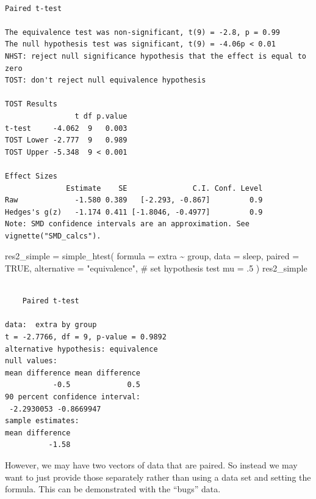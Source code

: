 \documentclass[
]{interact}
\newenvironment{Shaded}{\begin{snugshade}}{\end{snugshade}}
\newcommand{\AttributeTok}[1]{\textcolor[rgb]{0.40,0.45,0.13}{#1}}
\newcommand{\CommentTok}[1]{\textcolor[rgb]{0.37,0.37,0.37}{#1}}
\newcommand{\ConstantTok}[1]{\textcolor[rgb]{0.56,0.35,0.01}{#1}}
\newcommand{\DecValTok}[1]{\textcolor[rgb]{0.68,0.00,0.00}{#1}}
\newcommand{\FunctionTok}[1]{\textcolor[rgb]{0.28,0.35,0.67}{#1}}
\newcommand{\NormalTok}[1]{\textcolor[rgb]{0.00,0.23,0.31}{#1}}
\newcommand{\OtherTok}[1]{\textcolor[rgb]{0.00,0.23,0.31}{#1}}
\newcommand{\SpecialCharTok}[1]{\textcolor[rgb]{0.37,0.37,0.37}{#1}}
\newcommand{\StringTok}[1]{\textcolor[rgb]{0.13,0.47,0.30}{#1}}
\begin{document}
\begin{verbatim}

Paired t-test

The equivalence test was non-significant, t(9) = -2.8, p = 0.99
The null hypothesis test was significant, t(9) = -4.06p < 0.01
NHST: reject null significance hypothesis that the effect is equal to zero 
TOST: don't reject null equivalence hypothesis

TOST Results 
                t df p.value
t-test     -4.062  9   0.003
TOST Lower -2.777  9   0.989
TOST Upper -5.348  9 < 0.001

Effect Sizes 
              Estimate    SE               C.I. Conf. Level
Raw             -1.580 0.389   [-2.293, -0.867]         0.9
Hedges's g(z)   -1.174 0.411 [-1.8046, -0.4977]         0.9
Note: SMD confidence intervals are an approximation. See vignette("SMD_calcs").
\end{verbatim}

\begin{Shaded}
\begin{Highlighting}[]
\NormalTok{res2\_simple }\OtherTok{=} \FunctionTok{simple\_htest}\NormalTok{(}
  \AttributeTok{formula =}\NormalTok{ extra }\SpecialCharTok{\textasciitilde{}}\NormalTok{ group,}
  \AttributeTok{data =}\NormalTok{ sleep,}
  \AttributeTok{paired =} \ConstantTok{TRUE}\NormalTok{,}
  \AttributeTok{alternative =} \StringTok{"equivalence"}\NormalTok{,}
  \CommentTok{\# set hypothesis test}
  \AttributeTok{mu =}\NormalTok{ .}\DecValTok{5}
\NormalTok{)}
\NormalTok{res2\_simple}
\end{Highlighting}
\end{Shaded}

\begin{verbatim}

    Paired t-test

data:  extra by group
t = -2.7766, df = 9, p-value = 0.9892
alternative hypothesis: equivalence
null values:
mean difference mean difference 
           -0.5             0.5 
90 percent confidence interval:
 -2.2930053 -0.8669947
sample estimates:
mean difference 
          -1.58 
\end{verbatim}

\newpage

However, we may have two vectors of data that are paired. So instead we
may want to just provide those separately rather than using a data set
and setting the formula. This can be demonstrated with the ``bugs''
data.

\begin{Shaded}
\end{Shaded}
\end{document}
